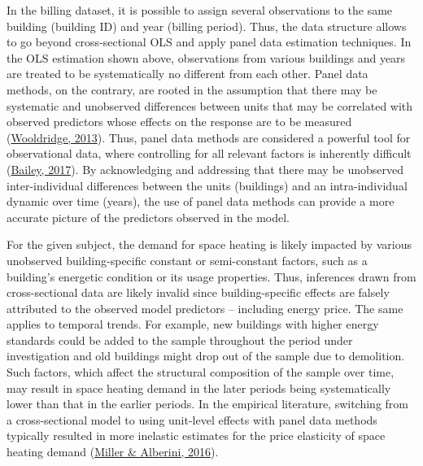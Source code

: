\documentclass[12pt,twoside]{reedthesis}
\begin{document}
In the billing dataset, it is possible to assign several observations to the same building (building ID) and year (billing period). Thus, the data structure allows to go beyond cross-sectional OLS and apply panel data estimation techniques. In the OLS estimation shown above, observations from various buildings and years are treated to be systematically no different from each other. Panel data methods, on the contrary, are rooted in the assumption that there may be systematic and unobserved differences between units that may be correlated with observed predictors whose effects on the response are to be measured (\protect\hyperlink{ref-wooldridge13}{Wooldridge, 2013}). Thus, panel data methods are considered a powerful tool for observational data, where controlling for all relevant factors is inherently difficult (\protect\hyperlink{ref-bailey17}{Bailey, 2017}). By acknowledging and addressing that there may be unobserved inter-individual differences between the units (buildings) and an intra-individual dynamic over time (years), the use of panel data methods can provide a more accurate picture of the predictors observed in the model.

For the given subject, the demand for space heating is likely impacted by various unobserved building-specific constant or semi-constant factors, such as a building's energetic condition or its usage properties. Thus, inferences drawn from cross-sectional data are likely invalid since building-specific effects are falsely attributed to the observed model predictors -- including energy price. The same applies to temporal trends. For example, new buildings with higher energy standards could be added to the sample throughout the period under investigation and old buildings might drop out of the sample due to demolition. Such factors, which affect the structural composition of the sample over time, may result in space heating demand in the later periods being systematically lower than that in the earlier periods. In the empirical literature, switching from a cross-sectional model to using unit-level effects with panel data methods typically resulted in more inelastic estimates for the price elasticity of space heating demand (\protect\hyperlink{ref-miller_alberini16}{Miller \& Alberini, 2016}).
\end{document}
